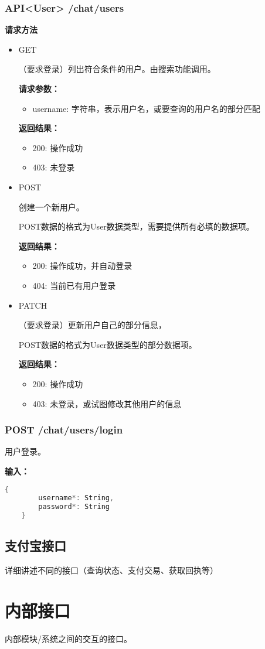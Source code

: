 \subsubsection{\textbf{API<User>} /chat/users}
\textbf{请求方法}
\begin{itemize}
    \item GET

        （要求登录）列出符合条件的用户。由搜索功能调用。

        \textbf{请求参数：}
        \begin{itemize}
            \item username: 字符串，表示用户名，或要查询的用户名的部分匹配
        \end{itemize}
        \textbf{返回结果：}
        \begin{itemize}
            \item 200: 操作成功
            \item 403: 未登录
        \end{itemize}
    \item POST
        
        创建一个新用户。

        POST数据的格式为User数据类型，需要提供所有必填的数据项。

        \textbf{返回结果：}
        \begin{itemize}
            \item 200: 操作成功，并自动登录
            \item 404: 当前已有用户登录
        \end{itemize}

    \item PATCH
        
        （要求登录）更新用户自己的部分信息，

        POST数据的格式为User数据类型的部分数据项。

        \textbf{返回结果：}
        \begin{itemize}
            \item 200: 操作成功
            \item 403: 未登录，或试图修改其他用户的信息
        \end{itemize}

\end{itemize}

\subsubsection{\textbf{POST} /chat/users/login}
用户登录。

\textbf{输入：}
\begin{lstlisting}[language=C]
    {
        username*: String,
        password*: String
    }
\end{lstlisting}

\subsection{支付宝接口}
详细讲述不同的接口（查询状态、支付交易、获取回执等）

\section{内部接口}
内部模块/系统之间的交互的接口。